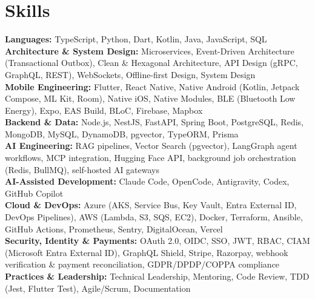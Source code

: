 \documentclass[a4paper,8pt]{article}
\begin{document}
\section{Skills}
\color[HTML]{1C033C}\textbf{Languages:} TypeScript, Python, Dart, Kotlin, Java, JavaScript, SQL\\[3pt]
\color[HTML]{1C033C}\textbf{Architecture \& System Design:} Microservices, Event-Driven Architecture (Transactional Outbox), Clean \& Hexagonal Architecture, API Design (gRPC, GraphQL, REST), WebSockets, Offline-first Design, System Design\\[3pt]
\color[HTML]{1C033C}\textbf{Mobile Engineering:} Flutter, React Native, Native Android (Kotlin, Jetpack Compose, ML Kit, Room), Native iOS, Native Modules, BLE (Bluetooth Low Energy), Expo, EAS Build, BLoC, Firebase, Mapbox\\[3pt]
\color[HTML]{1C033C}\textbf{Backend \& Data:} Node.js, NestJS, FastAPI, Spring Boot, PostgreSQL, Redis, MongoDB, MySQL, DynamoDB, pgvector, TypeORM, Prisma\\[3pt]
\color[HTML]{1C033C}\textbf{AI Engineering:} RAG pipelines, Vector Search (pgvector), LangGraph agent workflows, MCP integration, Hugging Face API, background job orchestration (Redis, BullMQ), self-hosted AI gateways\\[3pt]
\color[HTML]{1C033C}\textbf{AI-Assisted Development:} Claude Code, OpenCode, Antigravity, Codex, GitHub Copilot\\[3pt]
\color[HTML]{1C033C}\textbf{Cloud \& DevOps:} Azure (AKS, Service Bus, Key Vault, Entra External ID, DevOps Pipelines), AWS (Lambda, S3, SQS, EC2), Docker, Terraform, Ansible, GitHub Actions, Prometheus, Sentry, DigitalOcean, Vercel\\[3pt]
\color[HTML]{1C033C}\textbf{Security, Identity \& Payments:} OAuth 2.0, OIDC, SSO, JWT, RBAC, CIAM (Microsoft Entra External ID), GraphQL Shield, Stripe, Razorpay, webhook verification \& payment reconciliation, GDPR/DPDP/COPPA compliance\\[3pt]
\color[HTML]{1C033C}\textbf{Practices \& Leadership:} Technical Leadership, Mentoring, Code Review, TDD (Jest, Flutter Test), Agile/Scrum, Documentation\\[3pt]

\end{document}
